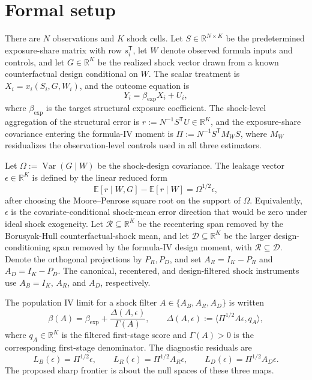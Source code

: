 \documentclass[11pt]{article}
\newcommand{\E}{\mathbb{E}}
\newcommand{\transpose}{\mathsf{T}}
\newcommand{\R}{\mathbb{R}}
\theoremstyle{definition}
\theoremstyle{plain}
\theoremstyle{remark}
\begin{document}
\section{Formal setup}
There are \(N\) observations and \(K\) shock cells.  Let \(S\in\R^{N\times K}\) be the predetermined exposure-share matrix with row \(s_i^\transpose\), let \(W\) denote observed formula inputs and controls, and let \(G\in\R^K\) be the realized shock vector drawn from a known counterfactual design conditional on \(W\).  The scalar treatment is \(X_i=x_i(S_i,G,W_i)\), and the outcome equation is
\[
  Y_i=\beta_{\exp}X_i+U_i,
\]
where \(\beta_{\exp}\) is the target structural exposure coefficient.  The shock-level aggregation of the structural error is \(r:=N^{-1}S^\transpose U\in\R^K\), and the exposure-share covariance entering the formula-IV moment is \(\Pi:=N^{-1}S^\transpose M_W S\), where \(M_W\) residualizes the observation-level controls used in all three estimators.

Let \(\Omega:=\operatorname{Var}(G\mid W)\) be the shock-design covariance.  The leakage vector \(\epsilon\in\R^K\) is defined by the linear reduced form
\[
  \E[r\mid W,G]-\E[r\mid W]=\Omega^{1/2}\epsilon,
\]
after choosing the Moore--Penrose square root on the support of \(\Omega\).  Equivalently, \(\epsilon\) is the covariate-conditional shock-mean error direction that would be zero under ideal shock exogeneity.  Let \(\mathcal R\subseteq\R^K\) be the recentering span removed by the Borusyak-Hull counterfactual-shock mean, and let \(\mathcal D\subseteq\R^K\) be the larger design-conditioning span removed by the formula-IV design moment, with \(\mathcal R\subseteq\mathcal D\).  Denote the orthogonal projections by \(P_R,P_D\), and set \(A_R=I_K-P_R\) and \(A_D=I_K-P_D\).  The canonical, recentered, and design-filtered shock instruments use \(A_B=I_K\), \(A_R\), and \(A_D\), respectively.

The population IV limit for a shock filter \(A\in\{A_B,A_R,A_D\}\) is written
\[
  \beta(A)=\beta_{\exp}+\frac{\Delta(A,\epsilon)}{\Gamma(A)},
  \qquad
  \Delta(A,\epsilon):=\langle \Pi^{1/2}A\epsilon,q_A\rangle,
\]
where \(q_A\in\R^K\) is the filtered first-stage score and \(\Gamma(A)>0\) is the corresponding first-stage denominator.  The diagnostic residuals are
\[
  L_B(\epsilon)=\Pi^{1/2}\epsilon,\qquad
  L_R(\epsilon)=\Pi^{1/2}A_R\epsilon,\qquad
  L_D(\epsilon)=\Pi^{1/2}A_D\epsilon.
\]
The proposed sharp frontier is about the null spaces of these three maps.
\end{document}
